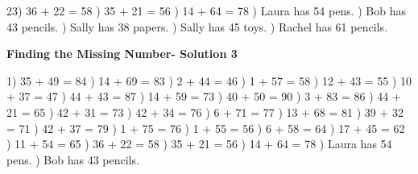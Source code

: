 \documentclass{article}%
\begin{document}
23) 36 + 22 = 58%
) 35 + 21 = 56%
) 14 + 64 = 78%
) Laura has 54 pens.%
) Bob has 43 pencils.%
) Sally has 38 papers.%
) Sally has 45 toys.%
) Rachel has 61 pencils.%
\newline%
\newpage%
\large%
\begin{center}%
\textbf{Finding the Missing Number- Solution 3}%
\newline%
\end{center} \normalsize%
1) 35 + 49 = 84%
) 14 + 69 = 83%
) 2 + 44 = 46%
) 1 + 57 = 58%
) 12 + 43 = 55%
) 10 + 37 = 47%
) 44 + 43 = 87%
) 14 + 59 = 73%
) 40 + 50 = 90%
) 3 + 83 = 86%
) 44 + 21 = 65%
) 42 + 31 = 73%
) 42 + 34 = 76%
) 6 + 71 = 77%
) 13 + 68 = 81%
) 39 + 32 = 71%
) 42 + 37 = 79%
) 1 + 75 = 76%
) 1 + 55 = 56%
) 6 + 58 = 64%
) 17 + 45 = 62%
) 11 + 54 = 65%
) 36 + 22 = 58%
) 35 + 21 = 56%
) 14 + 64 = 78%
) Laura has 54 pens.%
) Bob has 43 pencils.%
\end{document}
